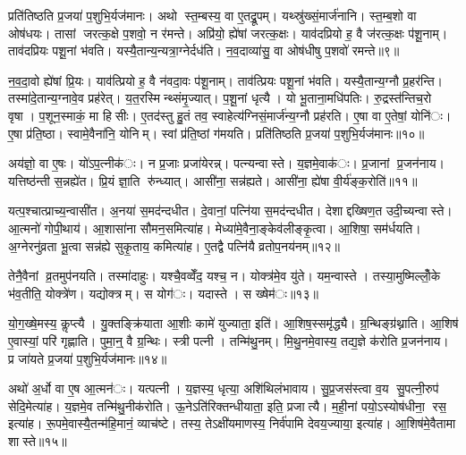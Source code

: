 प्रति॑तिष्ठति प्र॒जया॑ प॒शुभि॒र्यज॑मानः। अथो स्त॒म्बस्य॒ वा ए॒तद्रू॒पम्। यथ्स्रु॑ख्सं॒मार्ज॑नानि। स्त॒म्ब॒शो वा ओष॑धयः। तासां जरत्क॒क्षे प॒शवो॒ न र॑मन्ते। अप्रि॑यो॒ ह्ये॑षां जरत्क॒क्षः। याव॑दप्रियो ह॒ वै ज॑रत्क॒क्षः प॑शू॒नाम्। ताव॑दप्रियः पशू॒नां भ॑वति। यस्यै॒तान्य॒न्यत्रा॒ग्नेर्दध॑ति। न॒व॒दाव्या॑सु॒ वा ओष॑धीषु प॒शवो॑ रमन्ते॥९॥

न॒व॒दा॒वो ह्ये॑षां प्रि॒यः। याव॑त्प्रियो ह॒ वै न॑वदा॒वः प॑शू॒नाम्। ताव॑त्प्रियः पशू॒नां भ॑वति। यस्यै॒तान्य॒ग्नौ प्र॒हर॑न्ति। तस्मा॑दे॒तान्य॒ग्नावे॒व प्रह॑रेत्। य॒त॒रस्मिन्थ्संमृ॒ज्यात्। प॒शू॒नां धृत्यै। यो भू॒ताना॒मधि॑पतिः। रु॒द्रस्त॑न्तिच॒रो वृषा। प॒शून॒स्माकं॒ मा हिसीः। ए॒तद॑स्तु हु॒तं तव॒ स्वाहेत्य॑ग्निसं॒मार्ज॑न्य॒ग्नौ प्रह॑रति। ए॒षा वा ए॒तेषां॒ योनि॑ः। ए॒षा प्र॑ति॒ष्ठा। स्वामे॒वैना॑नि॒ योनिम्। स्वां प्र॑ति॒ष्ठां ग॑मयति। प्रति॑तिष्ठति प्र॒जया॑ प॒शुभि॒र्यज॑मानः॥१०॥


अय॑ज्ञो॒ वा ए॒षः। यो॑ऽप॒त्नीक॑ः। न प्र॒जाः प्रजा॑येरन्न्। पत्न्यन्वास्ते। य॒ज्ञमे॒वाक॑ः। प्र॒जानां प्र॒जन॑नाय। यत्तिष्ठ॑न्ती स॒न्नह्ये॑त। प्रि॒यं ज्ञा॒ति रु॑न्ध्यात्। आसी॑ना॒ सन्न॑ह्यते। आसी॑ना॒ ह्ये॑षा वी॒र्य॑ङ्क॒रोति॑॥११॥

यत्प॒श्चात्प्राच्य॒न्वासी॑त। अ॒नया॑ स॒मद॑न्दधीत। दे॒वानां॒ पत्नि॑या स॒मद॑न्दधीत। देशाद्दख्षिण॒त उदी॒च्यन्वास्ते। आ॒त्मनो॑ गोपी॒थाय॑। आ॒शासा॑ना सौमन॒समित्या॑ह। मेध्या॑मे॒वैना॒ङ्केव॑लीङ्कृ॒त्वा। आ॒शिषा॒ सम॑र्धयति। अ॒ग्नेरनु॑व्रता भू॒त्वा सन्न॑ह्ये सुकृ॒ताय॒ कमित्या॑ह। ए॒तद्वै पत्नि॑यै व्रतोप॒नय॑नम्॥१२॥

तेनै॒वैनां व्र॒तमुप॑नयति। तस्मा॑दाहुः। यश्चै॒वव्वेँद॒ यश्च॒ न। योक्त्र॑मे॒व यु॑ते। यम॒न्वास्ते। तस्या॒मुष्मिल्लोँ॒के भ॑व॒तीति॒ योक्त्रे॑ण। यद्योक्त्रम्। स योग॑ः। यदास्ते। स ख्षेम॑ः॥१३॥

यो॒ग॒ख्षे॒मस्य॒ कॢप्त्यै। यु॒क्तङ्क्रि॑याता आ॒शीः कामे॑ युज्याता॒ इति॑। आ॒शिष॒स्समृ॑द्ध्यै। ग्र॒न्थिङ्ग्र॑थ्नाति। आ॒शिष॑ ए॒वास्यां॒ परि॑ गृह्णाति। पुमा॒न्॒ वै ग्र॒न्थिः। स्त्री पत्नी। तन्मि॑थु॒नम्। मि॒थु॒नमे॒वास्य॒ तद्य॒ज्ञे क॑रोति प्र॒जन॑नाय। प्र जा॑यते प्र॒जया॑ प॒शुभि॒र्यज॑मानः॥१४॥

अथो॑ अ॒र्धो वा ए॒ष आ॒त्मन॑ः। यत्पत्नी। य॒ज्ञस्य॒ धृत्या॒ अशि॑थिलंभावाय। सु॒प्र॒जस॑स्त्वा व॒य सु॒पत्नी॒रुप॑ सेदि॒मेत्या॑ह। य॒ज्ञमे॒व तन्मि॑थु॒नीक॑रोति। ऊ॒नेऽति॑रिक्तन्धीयाता॒ इति॒ प्रजात्यै। म॒ही॒नां पयो॒ऽस्योष॑धीना॒ रस॒ इत्या॑ह। रू॒पमे॒वास्यै॒तन्म॑हि॒मानं॒ व्याच॑ष्टे। तस्य॒ तेऽक्षी॑यमाणस्य॒ निर्व॑पामि देवय॒ज्याया॒ इत्या॑ह। आ॒शिष॑मे॒वैतामा शास्ते॥१५॥

